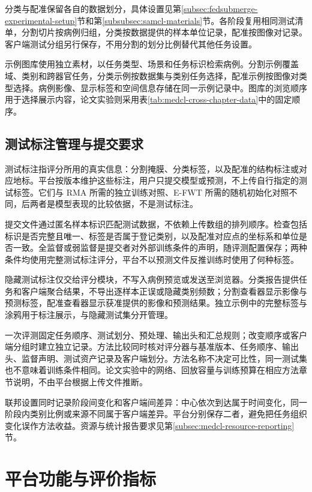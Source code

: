 分类与配准保留各自的数据划分，具体设置见第\ref{subsec:fedsubmerge-experimental-setup}节和第\ref{subsubsec:samcl-materials}节。各阶段复用相同测试清单，分割切片按病例归组，分类按数据提供的样本单位记录，配准按图像对记录。客户端测试分组另行保存，不用分割的划分比例替代其他任务设置。

示例图库使用独立素材，以任务类型、场景和任务标识检索病例。分割示例覆盖域、类别和跨器官任务，分类示例按数据集与类别任务选择，配准示例按图像对类型选择。病例影像、显示标签和空间信息存储在同一示例记录中。图库的浏览顺序用于选择展示内容，论文实验则采用表\ref{tab:medcl-cross-chapter-data}中的固定顺序。

\subsection{测试标注管理与提交要求}
\label{subsec:medcl-split-isolation}

测试标注指评分所用的真实信息：分割掩膜、分类标签，以及配准的结构标注或对应地标。平台按版本维护这些标注，用户只提交模型或预测，不上传自行指定的测试标签。它们与 RMA 所需的独立训练对照、E-FWT 所需的随机初始化对照不同，后两者是模型表现的比较依据，不是测试标注。

提交文件通过匿名样本标识匹配测试数据，不依赖上传数组的排列顺序。检查包括标识是否完整且唯一、标签是否属于登记类别，以及配准对应点的坐标系和单位是否一致。全监督或弱监督是提交者对外部训练条件的声明，随评测配置保存；两种条件均使用完整测试标注评分，平台不以预测文件反推训练时使用了何种标签。

隐藏测试标注仅交给评分模块，不写入病例预览或发送至浏览器。分类报告提供任务和客户端聚合结果，不导出逐样本正误或隐藏类别频数；分割查看器显示影像与预测标签，配准查看器显示获准提供的影像和预测结果。独立示例中的完整标签与涂鸦用于标注展示，与隐藏测试集分开管理。

\label{subsec:medcl-three-modes}

一次评测固定任务顺序、测试划分、预处理、输出头和汇总规则；改变顺序或客户端分组时建立独立记录。方法比较同时核对评分器与基准版本、任务顺序、输出头、监督声明、测试资产记录及客户端划分。方法名称不决定可比性，同一测试集也不意味着训练条件相同。论文实验中的网络、回放容量与训练预算在相应方法章节说明，不由平台根据上传文件推断。

联邦设置同时记录阶段间变化和客户端间差异：中心依次到达属于时间变化，同一阶段内类别比例或来源不同属于客户端差异。平台分别保存二者，避免把任务组织变化误作方法收益。资源与统计报告要求见第\ref{subsec:medcl-resource-reporting}节。

\section{平台功能与评价指标}
\label{sec:medcl-functions-evaluation}

